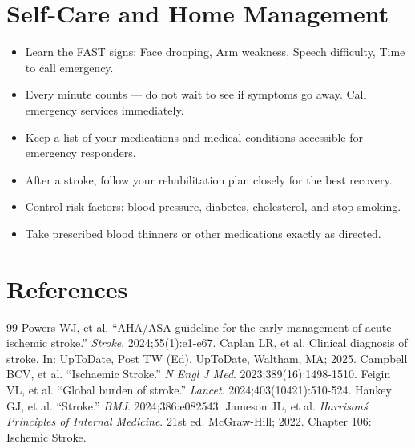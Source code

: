 \section*{Self-Care and Home Management}
\begin{itemize}
  \item Learn the FAST signs: Face drooping, Arm weakness, Speech difficulty, Time to call emergency.
  \item Every minute counts — do not wait to see if symptoms go away. Call emergency services immediately.
  \item Keep a list of your medications and medical conditions accessible for emergency responders.
  \item After a stroke, follow your rehabilitation plan closely for the best recovery.
  \item Control risk factors: blood pressure, diabetes, cholesterol, and stop smoking.
  \item Take prescribed blood thinners or other medications exactly as directed.
\end{itemize}

\section*{References}
\begin{thebibliography}{99}
 Powers WJ, et al. ``AHA/ASA guideline for the early management of acute ischemic stroke.'' \emph{Stroke}. 2024;55(1):e1-e67.
 Caplan LR, et al. Clinical diagnosis of stroke. In: UpToDate, Post TW (Ed), UpToDate, Waltham, MA; 2025.
 Campbell BCV, et al. ``Ischaemic Stroke.'' \emph{N Engl J Med}. 2023;389(16):1498-1510.
 Feigin VL, et al. ``Global burden of stroke.'' \emph{Lancet}. 2024;403(10421):510-524.
 Hankey GJ, et al. ``Stroke.'' \emph{BMJ}. 2024;386:e082543.
 Jameson JL, et al. \emph{Harrison\'s Principles of Internal Medicine}. 21st ed. McGraw-Hill; 2022. Chapter 106: Ischemic Stroke.
\end{thebibliography}
